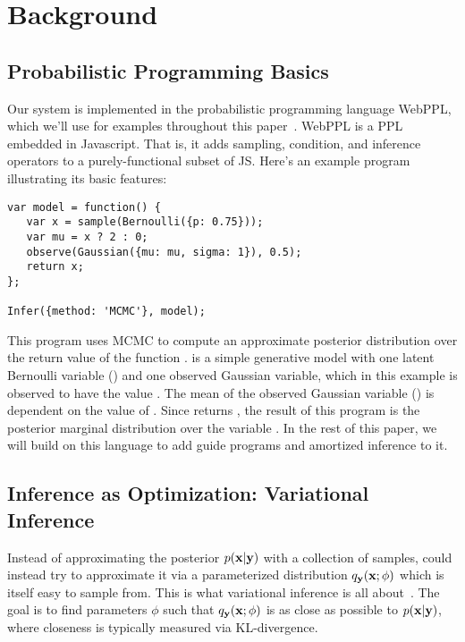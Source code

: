 \section{Background}
\label{sec:background}

\subsection{Probabilistic Programming Basics}
\label{sec:pplbasics}

Our system is implemented in the probabilistic programming language WebPPL, which we'll use for examples throughout this paper~\cite{WebPPL}.
WebPPL is a PPL embedded in Javascript.
That is, it adds sampling, condition, and inference operators to a purely-functional subset of JS.
Here's an example program illustrating its basic features:
\begin{lstlisting}
var model = function() {
   var x = sample(Bernoulli({p: 0.75}));
   var mu = x ? 2 : 0;
   observe(Gaussian({mu: mu, sigma: 1}), 0.5);
   return x;
};

Infer({method: 'MCMC'}, model);
\end{lstlisting}
This program uses MCMC to compute an approximate posterior distribution over the return value of the function .  is a simple generative model with one latent Bernoulli variable () and one observed Gaussian variable, which in this example is observed to have the value . The mean of the observed Gaussian variable () is dependent on the value of . Since  returns , the result of this program is the posterior marginal distribution over the variable .
In the rest of this paper, we will build on this language to add guide programs and amortized inference to it.

\subsection{Inference as Optimization: Variational Inference}
\label{sec:background:variational}

Instead of approximating the posterior $p(\mathbf{x} | \mathbf{y})$ with a collection of samples, could instead try to approximate it via a parameterized distribution $q_{\mathbf{y}}(\mathbf{x} ; \phi)$ which is itself easy to sample from.
This is what variational inference is all about~\cite{VariationalInference}.
The goal is to find parameters $\phi$ such that $q_{\mathbf{y}}(\mathbf{x} ; \phi)$ is as close as possible to $p(\mathbf{x} | \mathbf{y})$, where closeness is typically measured via KL-divergence.

